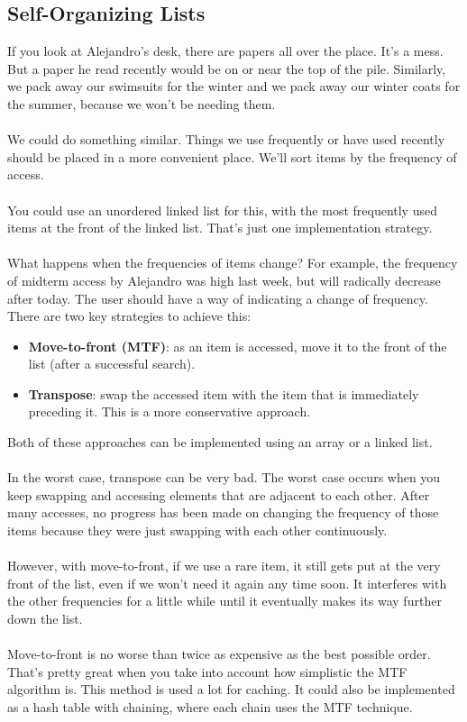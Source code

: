 \documentclass[]{article}
\theoremstyle{definition}
\begin{document}
		\subsection{Self-Organizing Lists}
			If you look at Alejandro's desk, there are papers all over the place. It's a mess. But a paper he read recently would be on or near the top of the pile. Similarly, we pack away our swimsuits for the winter and we pack away our winter coats for the summer, because we won't be needing them.
			\\ \\
			We could do something similar. Things we use frequently or have used recently should be placed in a more convenient place. We'll sort items by the frequency of access.
			\\ \\
			You could use an unordered linked list for this, with the most frequently used items at the front of the linked list. That's just one implementation strategy.
			\\ \\
			What happens when the frequencies of items change? For example, the frequency of midterm access by Alejandro was high last week, but will radically decrease after today. The user should have a way of indicating a change of frequency. There are two key strategies to achieve this:
			\begin{itemize}
				\item \textbf{Move-to-front (MTF)}: as an item is accessed, move it to the front of the list (after a successful search).
				\item \textbf{Transpose}: swap the accessed item with the item that is immediately preceding it. This is a more conservative approach.
			\end{itemize}

			Both of these approaches can be implemented using an array or a linked list.
			\\ \\
			In the worst case, transpose can be very bad. The worst case occurs when you keep swapping and accessing elements that are adjacent to each other. After many accesses, no progress has been made on changing the frequency of those items because they were just swapping with each other continuously.
			\\ \\
			However, with move-to-front, if we use a rare item, it still gets put at the very front of the list, even if we won't need it again any time soon. It interferes with the other frequencies for a little while until it eventually makes its way further down the list.
			\\ \\
			Move-to-front is no worse than twice as expensive as the best possible order. That's pretty great when you take into account how simplistic the MTF algorithm is. This method is used a lot for caching. It could also be implemented as a hash table with chaining, where each chain uses the MTF technique.
\end{document}
